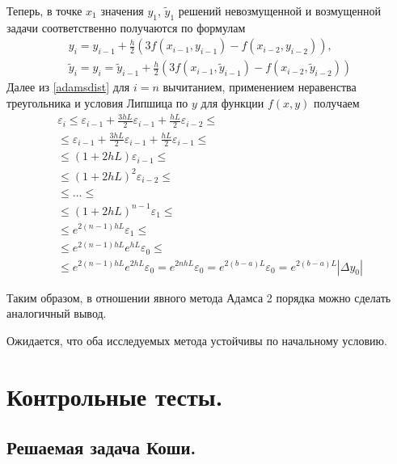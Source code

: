 \documentclass[a4paper, 12pt]{article}
\theoremstyle{mythm}
\begin{document}
	Теперь, в точке $x_1$ значения $y_1$, $\widetilde{y}_1$ решений невозмущенной и возмущенной задачи соответственно получаются по формулам
	\begin{equation} \label{adamsdist}
		\begin{gathered}
			y_i = y_{i-1} + \frac{h}{2}(3f(x_{i-1}, y_{i-1})-f(x_{i-2}, y_{i-2})),\\
			\widetilde{y}_i = y_i = \widetilde{y}_{i-1} + \frac{h}{2}(3f(x_{i-1}, \widetilde{y}_{i-1})-f(x_{i-2}, \widetilde{y}_{i-2}))
		\end{gathered}
	\end{equation}
	Далее из \eqref{adamsdist} для $i=n$ вычитанием, применением неравенства треугольника и условия Липшица по $y$ для функции $f(x,y)$ получаем
	\begin{equation}
		\begin{gathered}
			\varepsilon_i \leq \varepsilon_{i-1} + \frac{3hL}{2}\varepsilon_{i-1} + \frac{hL}{2}\varepsilon_{i-2} \leq \\ \leq
			\varepsilon_{i-1} + \frac{3hL}{2}\varepsilon_{i-1} + \frac{hL}{2}\varepsilon_{i-1} \leq \\ \leq
			(1 + 2hL)\varepsilon_{i-1} \leq \\ \leq (1+2hL)^2\varepsilon_{i-2} \leq \\ \leq \dots \leq \\ \leq
			(1 + 2hL)^{n-1}\varepsilon_{1} \leq \\ \leq e^{2(n-1)hL}\varepsilon_{1} \leq \\ \leq
			e^{2(n-1)hL}e^{hL}\varepsilon_0 \leq \\ \leq e^{2(n-1)hL}e^{2hL}\varepsilon_0 = e^{2nhL}\varepsilon_0 = 
			e^{2(b-a)L}\varepsilon_0 = e^{2(b-a)L}|\Delta y_0|
		\end{gathered}		
	\end{equation}
	
	Таким образом, в отношении явного метода Адамса 2 порядка можно сделать аналогичный вывод.
	
	Ожидается, что оба исследуемых метода устойчивы по начальному условию.
	
	\section{Контрольные тесты.}
	
	\subsection{Решаемая задача Коши.}
	
\end{document}
